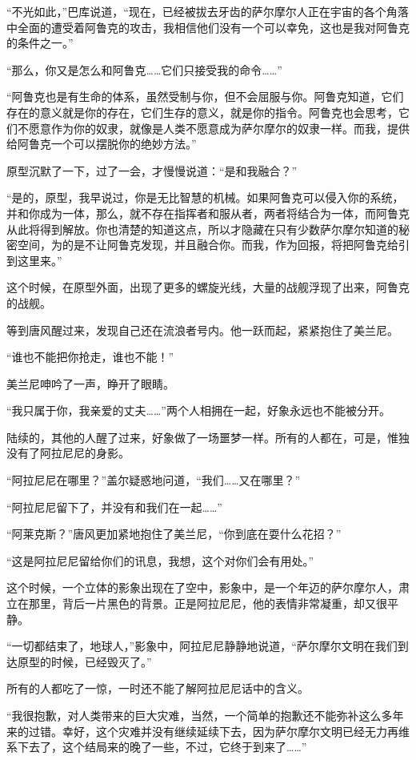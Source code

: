 “不光如此，”巴库说道，“现在，已经被拔去牙齿的萨尔摩尔人正在宇宙的各个角落中全面的遭受着阿鲁克的攻击，我相信他们没有一个可以幸免，这也是我对阿鲁克的条件之一。” 

“那么，你又是怎么和阿鲁克……它们只接受我的命令……” 

“阿鲁克也是有生命的体系，虽然受制与你，但不会屈服与你。阿鲁克知道，它们存在的意义就是你的存在，它们生存的意义，就是你的指令。阿鲁克也会思考，它们不愿意作为你的奴隶，就像是人类不愿意成为萨尔摩尔的奴隶一样。而我，提供给阿鲁克一个可以摆脱你的绝妙方法。” 

原型沉默了一下，过了一会，才慢慢说道：“是和我融合？” 

“是的，原型，我早说过，你是无比智慧的机械。如果阿鲁克可以侵入你的系统，并和你成为一体，那么，就不存在指挥者和服从者，两者将结合为一体，而阿鲁克从此将得到解放。你也清楚的知道这点，所以才隐藏在只有少数萨尔摩尔知道的秘密空间，为的是不让阿鲁克发现，并且融合你。而我，作为回报，将把阿鲁克给引到这里来。” 

这个时候，在原型外面，出现了更多的螺旋光线，大量的战舰浮现了出来，阿鲁克的战舰。 

等到唐风醒过来，发现自己还在流浪者号内。他一跃而起，紧紧抱住了美兰尼。 

“谁也不能把你抢走，谁也不能！” 

美兰尼呻吟了一声，睁开了眼睛。 

“我只属于你，我亲爱的丈夫……”两个人相拥在一起，好象永远也不能被分开。 

陆续的，其他的人醒了过来，好象做了一场噩梦一样。所有的人都在，可是，惟独没有了阿拉尼尼的身影。 

“阿拉尼尼在哪里？”盖尔疑惑地问道，“我们……又在哪里？” 

“阿拉尼尼留下了，并没有和我们在一起……” 

“阿莱克斯？”唐风更加紧地抱住了美兰尼，“你到底在耍什么花招？” 

“这是阿拉尼尼留给你们的讯息，我想，这个对你们会有用处。” 

这个时候，一个立体的影象出现在了空中，影象中，是一个年迈的萨尔摩尔人，肃立在那里，背后一片黑色的背景。正是阿拉尼尼，他的表情非常凝重，却又很平静。 

“一切都结束了，地球人，”影象中，阿拉尼尼静静地说道，“萨尔摩尔文明在我们到达原型的时候，已经毁灭了。” 

所有的人都吃了一惊，一时还不能了解阿拉尼尼话中的含义。 

“我很抱歉，对人类带来的巨大灾难，当然，一个简单的抱歉还不能弥补这么多年来的过错。幸好，这个灾难并没有继续延续下去，因为萨尔摩尔文明已经无力再维系下去了，这个结局来的晚了一些，不过，它终于到来了……” 

